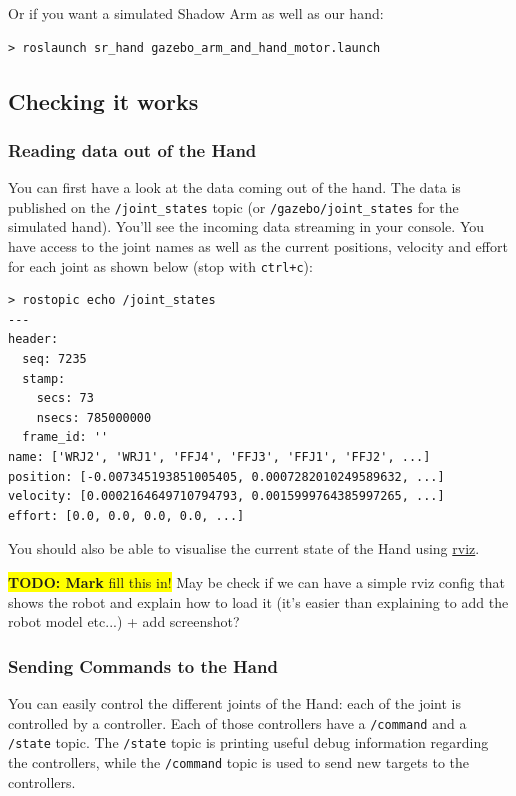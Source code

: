 \documentclass[12pt]{article}
\newcommand{\todo}[1]{\colorbox{yellow}{\textbf{TODO: #1} fill this in!}}
\begin{document}
\par Or if you want a simulated Shadow Arm as well as our hand:
  \begin{lstlisting}[escapeinside='']
> roslaunch sr_hand gazebo_arm_and_hand_motor.launch
  \end{lstlisting}

\subsection{Checking it works}
\label{sec:checking-it-works}

\subsubsection{Reading data out of the Hand}
\par You can first have a look at the data coming out of the hand. The data is published on the \texttt{/joint\_states} topic (or \texttt{/gazebo/joint\_states} for the simulated hand). You'll see the incoming data streaming in your console. You have access to the joint names as well as the current positions, velocity and effort for each joint as shown below (stop with \texttt{ctrl+c}):
  \begin{lstlisting}[escapeinside='']
> rostopic echo /joint_states
---
header:
  seq: 7235
  stamp:
    secs: 73
    nsecs: 785000000
  frame_id: ''
name: ['WRJ2', 'WRJ1', 'FFJ4', 'FFJ3', 'FFJ1', 'FFJ2', ...]
position: [-0.007345193851005405, 0.0007282010249589632, ...]
velocity: [0.0002164649710794793, 0.0015999764385997265, ...]
effort: [0.0, 0.0, 0.0, 0.0, ...]
  \end{lstlisting}

\par You should also be able to visualise the current state of the Hand using \href{ros.org/wiki/rviz}{rviz}.

\todo{Mark} May be check if we can have a simple rviz config that shows the robot and explain how to load it (it's easier than explaining to add the robot model etc...) + add screenshot?

\subsubsection{Sending Commands to the Hand}
\par You can easily control the different joints of the Hand: each of the joint is controlled by a controller. Each of those controllers have a \texttt{/command} and a \texttt{/state} topic. The \texttt{/state} topic is printing useful debug information regarding the controllers, while the \texttt{/command} topic is used to send new targets to the controllers.\\
\end{document}
